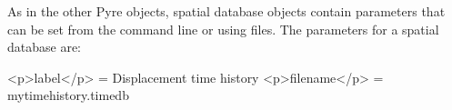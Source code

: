 As in the other Pyre objects, spatial database objects contain parameters
that can be set from the command line or using 
files. The parameters for a spatial database are:
\begin{inventory}
\end{inventory}

\begin{cfg}
<p>label</p> = Displacement time history
<p>filename</p> = mytimehistory.timedb
\end{cfg}

